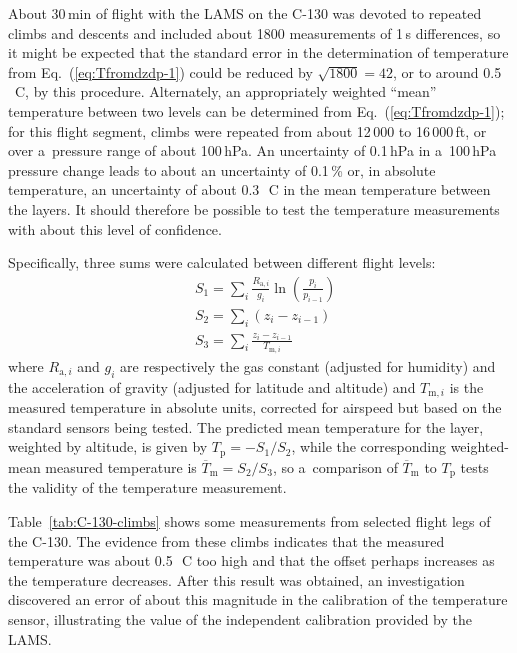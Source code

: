 \documentclass[amtd, online, hvmath]{copernicus}
\begin{document}
About 30\,min of flight with the LAMS on the C-130 was devoted to
repeated climbs and descents and included about 1800 measurements of
1\,s differences, so it might be expected that the standard error in
the determination of temperature from Eq.~(\ref{eq:Tfromdzdp-1}) could
be reduced by $\sqrt{1800}=42$, or to around 0.5\,\unit{{\degree}C},
by this procedure. Alternately, an appropriately weighted ``mean''
temperature between two levels can be determined from
Eq.~(\ref{eq:Tfromdzdp-1}); for this flight segment, climbs were
repeated from about 12\,000 to 16\,000\,ft, or over a~pressure range
of about 100\,hPa. An uncertainty of 0.1\,hPa in a~100\,hPa pressure
change leads to about an uncertainty of 0.1\,{\%} or, in absolute
temperature, an uncertainty of about 0.3\,\unit{{\degree}C} in the
mean temperature between the layers. It should therefore be possible
to test the temperature measurements with about this level of
confidence.

Specifically, three sums were calculated between different flight
levels:
\begin{align}
&S_1=\sum\limits_i\frac{R_{\mathrm{a},i}}{g_i}\ln\left(\frac{p_i}{p_{i-1}}\right)\label{eq:Sum1}\\
&S_2=\sum\limits_i(z_i-z_{i-1})\label{eq:Sum2}\\
&S_3=\sum\limits_i\frac{z_i-z_{i-1}}{T_{\mathrm{m},i}}\label{eq:Sum3}
\end{align}
where $R_{\mathrm{a},i}$ and $g_i$ are respectively the gas constant
(adjusted for humidity) and the acceleration of gravity (adjusted for
latitude and altitude) and $T_{\mathrm{m},i}$ is the measured
temperature in absolute units, corrected for airspeed but based on the
standard sensors being tested. The predicted mean temperature for the
layer, weighted by altitude, is given by $T_{\mathrm{p}}=-S_1/S_2$,
while the corresponding weighted-mean measured temperature is
$\overline{T}_{\mathrm{m}}=S_2/S_3$, so a~comparison of
$\overline{T}_{\mathrm{m}}$ to $T_{\mathrm{p}}$ tests the validity of
the temperature measurement.

Table~\ref{tab:C-130-climbs} shows some measurements from selected
flight legs of the C-130. The evidence from these climbs indicates
that the measured temperature was about 0.5\,\unit{{\degree}C} too
high and that the offset perhaps increases as the temperature
decreases. After this result was obtained, an investigation discovered
an error of about this magnitude in the calibration of the temperature
sensor, illustrating the value of the independent calibration provided
by the LAMS.
\end{document}
